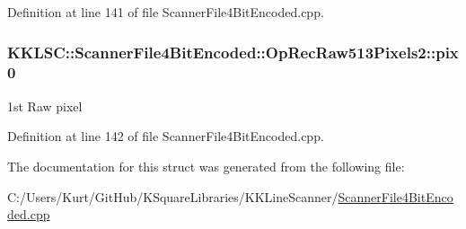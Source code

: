 Definition at line 141 of file Scanner\+File4\+Bit\+Encoded.\+cpp.

\subsubsection[{\texorpdfstring{pix0}{pix0}}]{ K\+K\+L\+S\+C\+::\+Scanner\+File4\+Bit\+Encoded\+::\+Op\+Rec\+Raw513\+Pixels2\+::pix0}\hypertarget{struct_scanner_file4_bit_encoded_1_1_op_rec_raw513_pixels2_a5d2cc4010e6c277bbd39ebfd343e4494}{}\label{struct_scanner_file4_bit_encoded_1_1_op_rec_raw513_pixels2_a5d2cc4010e6c277bbd39ebfd343e4494}
1st Raw pixel 

Definition at line 142 of file Scanner\+File4\+Bit\+Encoded.\+cpp.



The documentation for this struct was generated from the following file\+:\begin{DoxyCompactItemize}
\item 
C\+:/\+Users/\+Kurt/\+Git\+Hub/\+K\+Square\+Libraries/\+K\+K\+Line\+Scanner/\hyperlink{_scanner_file4_bit_encoded_8cpp}{Scanner\+File4\+Bit\+Encoded.\+cpp}\end{DoxyCompactItemize}
